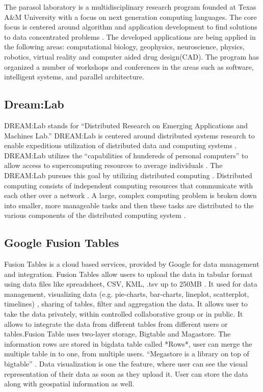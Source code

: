     The parasol laboratory is a multidisciplinary research program 
    founded at Texas A\&M University with a focus on next generation 
    computing languages.  The core focus is centered around algorithm 
    and application development to find solutions to data concentrated 
    problems \cite{www-parasol}. The developed applications are being 
    applied in the following areas: computational biology, geophysics, 
    neuroscience, physics, robotics, virtual reality and computer aided 
    drug design(CAD).  The program has organized a number of workshops 
    and conferences in the areas such as software, intelligent systems, 
    and parallel architecture.
    
\subsection{Dream:Lab}

    DREAM:Lab stands for ``Distributed Research on Emerging
    Applications and Machines Lab.'' \cite{dream} DREAM:Lab is
    centered around distributed systems research to enable expeditious
    utilization of distributed data and computing
    systems \cite{dream}. DREAM:Lab utilizes the ``capabilities of
    hundereds of personal computers'' to allow access to supercomputing
    resources to average individuals \cite{rao}. The DREAM:Lab
    pursues this goal by utilizing distributed computing \cite{rao}.
    Distributed computing consists of independent computing resources
    that communicate with each other over a network \cite{denero}. A
    large, complex computing problem is broken down into smaller, more
    manageable tasks and then these tasks are distributed to the
    various components of the distributed computing
    system \cite{denero}.
    
\subsection{Google Fusion Tables}
    
    Fusion Tables is a cloud based services, provided by Google for
    data management and integration. Fusion Tables allow users to
    upload the data in tabular format using data files like
    spreadsheet, CSV, KML, .tsv up to
    250MB \cite{www-FusionTableSupport}. It used for data management,
    visualizing data (e.g. pie-charts, bar-charts, lineplot,
    scatterplot, timelines) \cite{wiki-FusionTable} , sharing of
    tables, filter and aggregation the data. It allows user to take
    the data privately, within controlled collaborative group or in
    public. It allows to integrate the data from different tables from
    different users or tables.Fusion Table uses two-layer storage,
    Bigtable and Magastore. The information rows are stored in bigdata
    table called *Rows*, user can merge the multiple table in to one,
    from multiple users. ``Megastore is a library on top of
    bigtable'' \cite{GoogleFusionTable2012}. Data visualization is one
    the feature, where user can see the visual representation of their
    data as soon as they upload it. User can store the data along with
    geospatial information as well.


